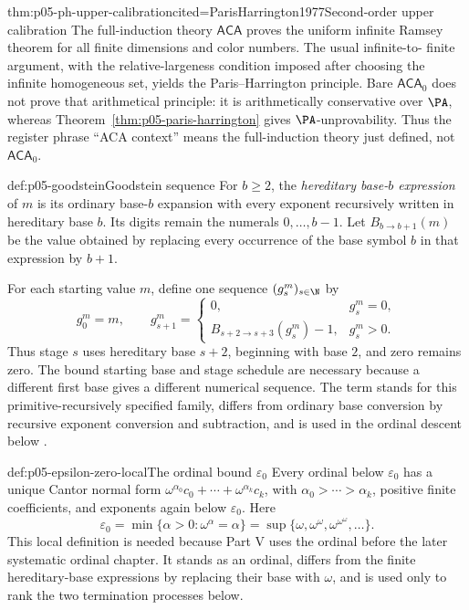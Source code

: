 \begin{hbtheorem}{thm:p05-ph-upper-calibration}{cited=ParisHarrington1977}{Second-order upper calibration}
The full-induction theory \(\mathsf{ACA}\) proves the uniform infinite Ramsey
theorem for all finite dimensions and color numbers.  The usual infinite-to-
finite argument, with the relative-largeness condition imposed after choosing
the infinite homogeneous set, yields the Paris--Harrington principle.
Bare \(\mathsf{ACA}_0\) does not prove that arithmetical principle: it is
arithmetically conservative over \(\PA\), whereas
Theorem~\ref{thm:p05-paris-harrington} gives \(\PA\)-unprovability.  Thus the
register phrase “ACA context” means the full-induction theory just defined,
not \(\mathsf{ACA}_0\).
\end{hbtheorem}

\begin{hbdefinition}{def:p05-goodstein}{Goodstein sequence}
For \(b\geq2\), the \emph{hereditary base-\(b\) expression} of \(m\) is its
ordinary base-\(b\) expansion with every exponent recursively written in
hereditary base \(b\).  Its digits remain the numerals \(0,\ldots,b-1\).  Let
\(B_{b\to b+1}(m)\) be the value obtained by replacing every occurrence of
the base symbol \(b\) in that expression by \(b+1\).

For each starting value \(m\), define one sequence \((g^m_s)_{s\in\N}\) by
\[
 g^m_0=m,\qquad
 g^m_{s+1}=
 \begin{cases}
   0, & g^m_s=0,\\
   B_{s+2\to s+3}(g^m_s)-1, & g^m_s>0.
 \end{cases}
\]
Thus stage \(s\) uses hereditary base \(s+2\), beginning with base \(2\), and
zero remains zero.  The bound starting base and stage schedule are necessary
because a different first base gives a different numerical sequence.  The
term stands for this primitive-recursively specified family, differs from
ordinary base conversion by recursive exponent conversion and subtraction,
and is used in the ordinal descent below \cite{Goodstein1944,KirbyParis1982}.
\end{hbdefinition}

\begin{hbdefinition}{def:p05-epsilon-zero-local}{The ordinal bound \(\varepsilon_0\)}
Every ordinal below \(\varepsilon_0\) has a unique Cantor normal form
\(\omega^{\alpha_0}c_0+\cdots+\omega^{\alpha_k}c_k\), with
\(\alpha_0>\cdots>\alpha_k\), positive finite coefficients, and exponents
again below \(\varepsilon_0\).  Here
\[
 \varepsilon_0=\min\{\alpha>0:\omega^\alpha=\alpha\}
 =\sup\{\omega,\omega^\omega,
          \omega^{\omega^\omega},\ldots\}.
\]
This local definition is needed because Part V uses the ordinal before the
later systematic ordinal chapter.  It stands as an ordinal, differs from the
finite hereditary-base expressions by replacing their base with \(\omega\),
and is used only to rank the two termination processes below.
\end{hbdefinition}

